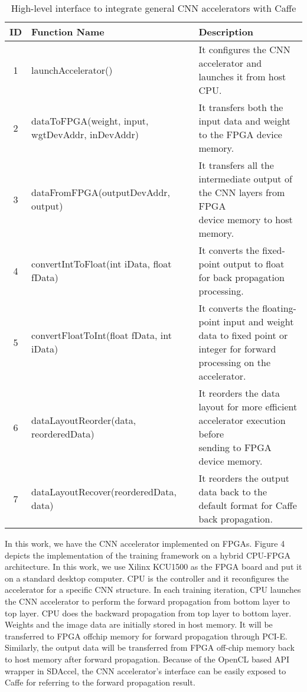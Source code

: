 \begin{table*}
        \centering
        \vspace{-0.3em}
        \caption{High-level interface to integrate general CNN accelerators with Caffe}
        \label{tab:graph}
        \vspace{-0.3em}
        \begin{tabular}{c|l|l}
                \toprule
                ID & Function Name & Description  \\
                \midrule
                1 & launchAccelerator() & It configures the CNN accelerator and launches it from host CPU. \\
		\midrule
                2 & dataToFPGA(weight, input, wgtDevAddr, inDevAddr) & It transfers both the input data and weight to the FPGA device memory. \\
		\midrule
		3 & dataFromFPGA(outputDevAddr, output) & \shortstack[l]{It transfers all the intermediate output of the CNN layers from FPGA \\device memory to host memory.} \\
		\midrule
		4 & convertIntToFloat(int iData, float fData) & It converts the fixed-point output to float for back propagation processing. \\
		\midrule
		5 & convertFloatToInt(float fData,  int iData) & \shortstack[l]{It converts the floating-point input and weight data to fixed point or \\integer for forward processing on the accelerator.} \\
		\midrule
		6 & dataLayoutReorder(data, reorderedData) & \shortstack[l]{It reorders the data layout for more efficient accelerator execution before \\sending to FPGA device memory.} \\
		\midrule
		7 & dataLayoutRecover(reorderedData, data) & It reorders the output data back to the default format for Caffe back propagation. \\
                \bottomrule
        \end{tabular}
        \vspace{-1em}
\end{table*}
In this work, we have the CNN accelerator implemented on FPGAs.
Figure 4 depicts the implementation of the training framework on a hybrid 
CPU-FPGA architecture. In this work, we use Xilinx KCU1500 as the FPGA board 
and put it on a standard desktop computer. CPU is the controller and it reconfigures 
the accelerator for a specific CNN structure. In each training iteration, CPU launches 
the CNN accelerator to perform the forward propagation from bottom layer to top layer. 
CPU does the backward propagation from top layer to bottom layer. Weights and the image 
data are initially stored in host memory. It will be transferred to FPGA offchip memory 
for forward propagation through PCI-E. Similarly, the output data will be transferred 
from FPGA off-chip memory back to host memory after forward propagation. Because of the 
OpenCL based API wrapper in SDAccel, the CNN accelerator’s interface can be easily 
exposed to Caffe for referring to the forward propagation result. 


